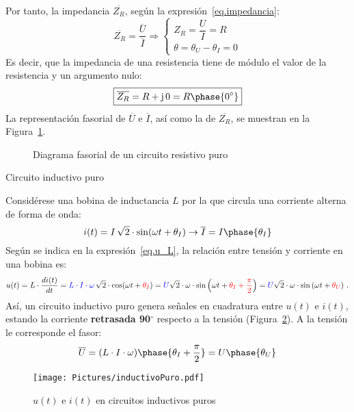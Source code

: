 \documentclass[11pt]{book} %
\makeatletter
\numberwithin{dummy}{section}
\theoremstyle{ocrenumbox}
\theoremstyle{blacknumex}
\theoremstyle{blacknumbox}
\theoremstyle{ocrenum}
\renewcommand{\subsection}{\@startsection {subsection}{2}{\z@}
{-3ex \@plus -0.1ex \@minus -.4ex}
{0.5ex \@plus.2ex }
{\normalfont\sffamily\bfseries}}
\newlength\esp
\makeatother
\begin{document}
	Por tanto, la impedancia $\overline{Z_R}$, según la expresión~\eqref{eq.impedancia}:
	\begin{equation*}
		\overline{Z_R}=\dfrac{\overline{U}}{\overline{I}}\Rightarrow
		\begin{cases}
			Z_R=\dfrac{U}{I}=R\\
			\theta=\theta_U-\theta_I=0
		\end{cases}
	\end{equation*}
	Es decir, que la impedancia de una resistencia tiene de módulo el valor de la resistencia y un argumento nulo: 
	\begin{equation}\label{eq.resistencia}
		\boxed{ \overline{Z_R}=R+\mathrm{j}\,0=R\phase{0^\circ}}
	\end{equation}
	La representación fasorial de $\overline{U}$ e $\overline{I}$, así como la de $\overline{Z_R}$, se muestran en la Figura~\ref{fig.fasorResistencia}. 
	\begin{figure}[htbp]
		\centering
		\hfil
		\caption{Diagrama fasorial de un circuito resistivo puro}
		\label{fig.fasorResistencia}
	\end{figure}
	
	\subsection{Circuito inductivo puro}\label{sec.L-puro}
	
	Considérese una bobina de inductancia $L$ por la que circula una corriente alterna de forma de onda:
	\begin{equation*}
		i(t)=I\,\sqrt{2}\cdot\sin(\omega t+\theta_I)\rightarrow\overline{I}=I\phase{\theta_I}
	\end{equation*}
	Según se indica en la expresión~\eqref{eq.u_L}, la relación entre tensión y corriente en una bobina es: 
	\begin{equation*}
		u(t)=L\cdot\dfrac{di(t)}{dt}={\color{blue}L\cdot I \cdot \omega}\,\sqrt{2}\cdot  \cos(\omega t+{\color{red}\theta_I})= {\color{blue} U} \sqrt{2}\cdot \omega\cdot  \sin \left(\omega t+{\color{red}\theta_I+\frac{\pi}{2}}\right)= {\color{blue} U} \sqrt{2}\cdot \omega\cdot  \sin \left(\omega t+{\color{red}\theta_U}\right)\,.
	\end{equation*}
	Así, un circuito inductivo puro genera señales en cuadratura entre $u(t)$ e $i(t)$, estando la corriente \textbf{retrasada 90$^\circ$} respecto a la tensión (Figura~\ref{fig.inductivoPuro}). A la tensión le corresponde el fasor:
	\begin{equation*}
		\overline{U}=(L\cdot I\cdot\omega)\phase{\theta_I+\frac{\pi}{2}}=U\phase{\theta_U}
	\end{equation*}
	\begin{figure}[htbp]
		\centering
		\texttt{[image: Pictures/inductivoPuro.pdf]}
		\caption{$u(t)$ e $i(t)$ en circuitos inductivos puros}
		\label{fig.inductivoPuro}
	\end{figure}
	
\end{document}
